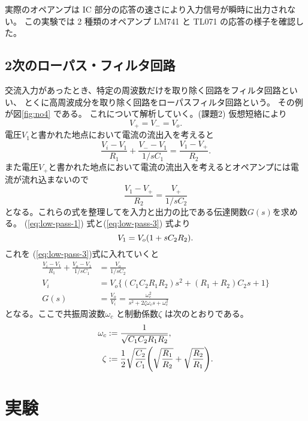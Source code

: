 \documentclass[11pt,dvipdfmx,a4paper]{jsarticle}
\begin{document}
実際のオペアンプは IC 部分の応答の速さにより入力信号が瞬時に出力されない。
この実験では 2 種類のオペアンプ LM741 と TL071 の応答の様子を確認した。


\subsection{2次のローパス・フィルタ回路}

交流入力があったとき、特定の周波数だけを取り除く回路をフィルタ回路といい、
とくに高周波成分を取り除く回路をローパスフィルタ回路という。
その例が図\ref{fig:no4} である。
これについて解析していく。(課題2)
仮想短絡により
\begin{equation}
	V_{+} = V_{-} = V_o. \label{eq:low-pass-1}
\end{equation}
電圧\(V_1\)と書かれた地点において電流の流出入を考えると
\begin{equation}
	\frac{V_i-V_1}{R_1}+\frac{V_{-}-V_1}{1/sC_1} = \frac{V_1-V_{+}}{R_2} \label{eq:low-pass-2}.
\end{equation}
また電圧\(V_{+}\)と書かれた地点において電流の流出入を考えるとオペアンプには電流が流れ込まないので
\begin{equation}
	\frac{V_1-V_{+}}{R_2} = \frac{V_{+}}{1/sC_2} \label{eq:low-pass-3}
\end{equation}
となる。これらの式を整理してを入力と出力の比である伝達関数\(G(s)\)を求める。
(\ref{eq:low-pass-1}) 式と(\ref{eq:low-pass-3}) 式より
\begin{equation}
	V_1 = V_o \qty(1+sC_2 R_2).
\end{equation}
これを (\ref{eq:low-pass-3})式に入れていくと
\begin{align}
	\frac{V_i-V_1}{R_1}+\frac{V_{o}-V_1}{1/sC_1} &= \frac{V_{o}}{1/sC_2}\\
	V_i &= V_o \biggl\{(C_1C_2R_1R_2)s^2+(R_1+R_2)C_2s+1\biggr\}\\
	G(s) &= \frac{V_o}{V_i} = \frac{\omega_c^2}{s^2+2\zeta\omega_c s+\omega_c^2} \label{eq:low-pass-4}
\end{align}
となる。ここで共振周波数\(\omega_c\) と制動係数\(\zeta\) は次のとおりである。
\begin{align}
	\omega_c &:= \frac{1}{\sqrt{C_1C_2R_1R_2}},\\
	\zeta &:= \frac{1}{2}\sqrt{\frac{C_2}{C_1}}\qty(\sqrt{\frac{R_1}{R_2}}+\sqrt{\frac{R_2}{R_1}}).
\end{align}

\section{実験}
\end{document}
